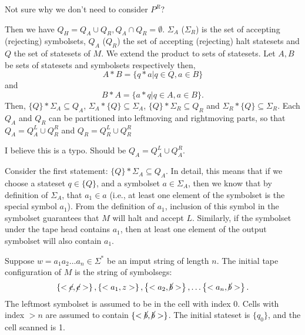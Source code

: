 \begin{error}
    Not sure why we don't need to consider $P^R$?
\end{error}

Then we have $Q_H = Q_A \cup Q_R, Q_A \cap Q_R = \emptyset$.
$\Sigma_A$ ($\Sigma_R$) is the set of accepting (rejecting) symbolsets,
$Q_A$ ($Q_R$) the set of accepting (rejecting) halt statesets and
${Q}$ the set of statesets of $M$.
We extend the product to sets of statesets.
Let $A, B$ be sets of
statesets and symbolsets respectively then,
\[
    A*B = \{q*a | q \in Q, a \in B\}
\]
and
\[
    B*A = \{a*q | q \in A, a \in B\}.
\]
Then, $\{Q\} * \Sigma_A \subseteq Q_A$, $\Sigma_A * \{Q\} \subseteq \Sigma_A$,
$\{Q\} * \Sigma_R \subseteq Q_R$ and $\Sigma_R * \{Q\} \subseteq \Sigma_R$.
Each $Q_A$ and $Q_R$ can be partitioned into leftmoving and rightmoving
parts, so that $Q_A = Q_A^L \cup Q_R^R$ and $Q_R = Q_R^L \cup Q_R^R$

\begin{error}
    I believe this is a typo.  Should be $Q_A = Q_A^L \cup Q_A^R$.
\end{error}

\begin{aside}
    Consider the first statement: $\{Q\} * \Sigma_A \subseteq Q_A$.
    In detail, this means that if we choose a stateset $q \in \{Q\}$,
    and a symbolset $a \in \Sigma_A$, then we know that by definition
    of $\Sigma_A$, that $a_1 \in a$ (i.e., at least one element of the
    symbolset is the special symbol $a_1$).
    From the definition of $a_1$, inclusion of this symbol in the
    symbolset guarantees that $M$ will halt and accept $L$.
    Similarly, if the symbolset under the tape head contains $a_1$,
    then at least one element of the output symbolset will also
    contain $a_1$.
\end{aside}

Suppose $w = a_1 a_2 \ldots a_n \in \Sigma^*$ be an imput string of length $n$.
The initial tape configuration of $M$ is the string of symbolsegs:
\[
    \left\{<\cancel{c}, \cancel{c}>\right\},
    \left\{<a_1,z>\right\},
    \left\{<a_2,\cancel{b}>\right\},
    \ldots
    \left\{<a_n,\cancel{b}>\right\}.
\]
The leftmost symbolset is assumed to be in the cell with index 0.
Cells with index $> n$ are assumed to contain $\{<\cancel{b},\cancel{b}>\}$.
The initial stateset is $\{q_0\}$, and the cell scanned is 1.


